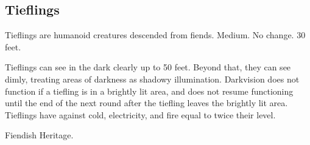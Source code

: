     \subsection{Tieflings}

        Tieflings are humanoid creatures descended from fiends.
         Medium.
         No change.
         30 feet.
        \begin{itemize}
             Tieflings can see in the dark clearly up to 50 feet. Beyond that, they can see dimly, treating areas of darkness as shadowy illumination. Darkvision does not function if a tiefling is in a brightly lit area, and does not resume functioning until the end of the next round after the tiefling leaves the brightly lit area.
             Tieflings have  against cold, electricity, and fire equal to twice their level.
        \end{itemize}
         Fiendish Heritage.






